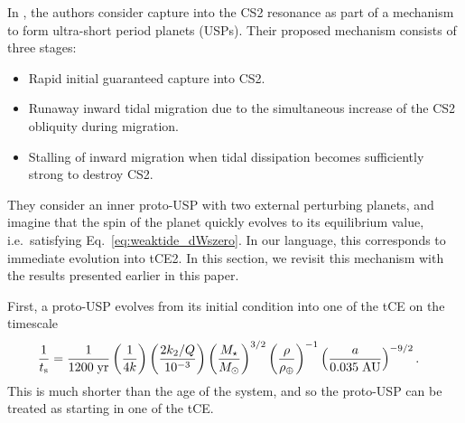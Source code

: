 \documentclass[
        fleqn,
        usenatbib,
    ]{mnras}
\newcommand*{\p}[1]{\left(#1\right)}
\begin{document}
In \citet{millholland2020formation}, the authors consider capture into the CS2
resonance as part of a mechanism to form ultra-short period planets (USPs).
Their proposed mechanism consists of three stages:
\begin{itemize}
    \item Rapid initial guaranteed capture into CS2.

    \item Runaway inward tidal migration due to the simultaneous increase of the
        CS2 obliquity during migration.

    \item Stalling of inward migration when tidal dissipation becomes
        sufficiently strong to destroy CS2.
\end{itemize}
They consider an inner proto-USP with two external perturbing planets, and
imagine that the spin of the planet quickly evolves to its equilibrium value,
i.e.\ satisfying Eq.~\eqref{eq:weaktide_dWszero}. In our language, this
corresponds to immediate evolution into tCE2. In this section, we revisit this
mechanism with the results presented earlier in this paper.

First, a proto-USP evolves from its initial condition into one of the tCE on the
timescale
\begin{align}
    \frac{1}{t_{\rm s}} ={}& \frac{1}{1200\;\mathrm{yr}}
            \p{\frac{1}{4k}}
            \p{\frac{2k_2/Q}{10^{-3}}}
            \p{\frac{M_\star}{M_{\odot}}}^{3/2}
            \p{\frac{\rho}{\rho_{\oplus}}}^{-1}
            \p{\frac{a}{0.035\;\mathrm{AU}}}^{-9/2}.
\end{align}
This is much shorter than the age of the system, and so the proto-USP can be
treated as starting in one of the tCE\@.
\end{document}

